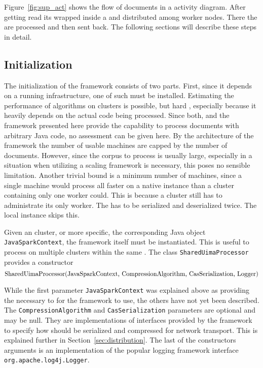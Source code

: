 Figure~\ref{fig:sup_act} shows the flow of documents in a \uml{} activity diagram. After getting read its wrapped inside a \cas{} and distributed among worker nodes. There the \cas{} are processed and then sent back. The following sections will describe these steps in detail.

\subsection{Initialization}
\label{sec:init}
The initialization of the framework consists of two parts. First, since it depends on a running \spark{} infrastructure, one of such must be installed. Estimating the performance of algorithms on \spark{} clusters is possible, but hard \cite{wang2015performance,gopalani2015comparing}, especially because it heavily depends on the actual code being processed. Since both, \uima{} and the framework presented here provide the capability to process documents with arbitrary Java code, no assessment can be given here. By the architecture of the framework the number of usable machines are capped by the number of documents. However, since the corpus to process is usually large, especially in a situation when utilizing a scaling framework is necessary, this poses no sensible limitation. Another trivial bound is a minimum number of machines, since a single machine would process all \cas{} faster on a native \uima{} instance than a \spark{} cluster containing only one worker could. This is because a \spark{} cluster still has to administrate its only worker. The \cas{} has to be serialized and deserialized twice. The local \uima{} instance skips this.

Given an \spark{} cluster, or more specific, the corresponding Java object \lstinline|JavaSparkContext|, the framework itself must be instantiated. This is useful to process on multiple \spark{} clusters within the same \jvm{}. The class \lstinline|SharedUimaProcessor| provides a constructor 
\[ 
\text{\lstinline|SharedUimaProcessor(JavaSparkContext, CompressionAlgorithm, CasSerialization, Logger)|}
\]

While the first parameter \lstinline|JavaSparkContext| was explained above as providing the necessary \api{} to \spark{} for the framework to use, the others have not yet been described. The \lstinline|CompressionAlgorithm| and \lstinline|CasSerialization| parameters are optional and may be null. They are implementations of interfaces provided by the framework to specify how \cas{} should be serialized and compressed for network transport. This is explained further in Section~\ref{sec:distribution}. The last of the constructors arguments is an implementation of the popular logging framework interface \lstinline|org.apache.log4j.Logger|.

